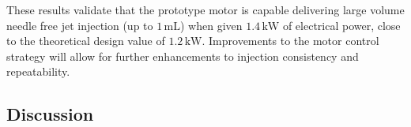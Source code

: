             
            These results validate that the prototype motor is capable delivering large volume needle free jet injection (up to $1\,\mathrm{mL}$) when given $1.4\,\mathrm{kW}$ of electrical power, close to the theoretical design value of $1.2\,\mathrm{kW}$. Improvements to the motor control strategy will allow for further enhancements to injection consistency and repeatability.
            
    
        
        
        \subsection{Discussion}                     \label{Chapter:experiment/validation/discussion}
        